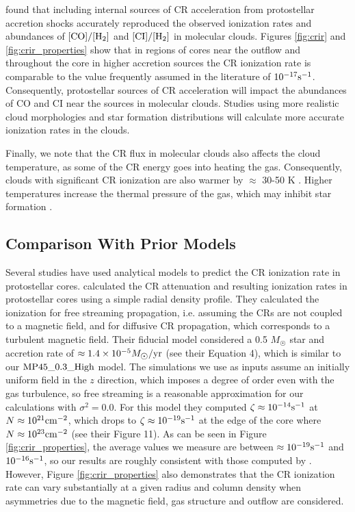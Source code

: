 \documentclass[twocolumn]{aastex63}
\begin{document}
\cite{gaches_2019_mc1, gaches_2019_mc2} found that including internal sources of CR acceleration from protostellar accretion shocks accurately reproduced the observed ionization rates and abundances of $[\rm CO]/[\rm H_2]$ and $[\rm CI]/[\rm H_2]$ in molecular clouds. Figures \ref{fig:crir} and \ref{fig:crir_properties} show that in regions of cores near the outflow and throughout the core in higher accretion sources the CR ionization rate is comparable to the value frequently assumed in the literature of $10^{-17} \rm s^{-1}$. Consequently, protostellar sources of CR acceleration will impact the abundances of CO and CI near the sources in molecular clouds. Studies using more realistic cloud morphologies and star formation distributions will calculate more accurate ionization rates in the clouds. 

Finally, we note that the CR flux in molecular clouds also affects the cloud temperature, as some of the CR energy goes into heating the gas. Consequently, clouds with significant CR ionization are also warmer by $\approx$ 30-50 K \citep{bisbas_2017_chemistry, gaches_2018_exploration}. Higher temperatures increase the thermal pressure of the gas, which may inhibit star formation \citep{mckee_2007_sf}. 

\subsection{Comparison With Prior Models}
\label{subsection:comparison}

Several studies have used analytical models to predict the CR ionization rate in protostellar cores. \cite{gaches_2018_exploration} calculated the CR attenuation and resulting ionization rates in protostellar cores using a simple radial density profile. They calculated the ionization for free streaming propagation, i.e. assuming the CRs are not coupled to a magnetic field, and for diffusive CR propagation, which corresponds to a turbulent magnetic field. Their fiducial model considered a 0.5 $M_{\astrosun}$ star and accretion rate of $\approx 1.4 \times 10^{-5} M_{\astrosun}/\rm yr$ (see their Equation 4), which is similar to our $\rm MP45\_0.3\_High$ model. The \citet{offner_2017_impact} simulations we use as inputs assume an initially uniform field in the $z$ direction, which imposes a degree of order even with the gas turbulence, so free streaming is a reasonable approximation for our calculations with $\sigma^2=0.0$. For this model they computed $\zeta \approx 10^{-14} \rm s^{-1}$ at $N\approx10^{21} \rm cm^{-2}$, which drops to $\zeta \approx 10^{-19} \rm s^{-1}$ at the edge of the core where $N \approx 10^{23} \rm cm^{-2}$ (see their Figure 11). As can be seen in Figure \ref{fig:crir_properties}, the average values we measure are between $ \approx 10^{-19} \rm s^{-1}$ and $10^{-16} \rm s^{-1}$, so our results are roughly consistent with those computed by \cite{gaches_2018_exploration}. However, Figure \ref{fig:crir_properties} also demonstrates that the CR ionization rate can vary substantially at a given radius and column density when asymmetries due to the magnetic field, gas structure and outflow are considered.
\end{document}
